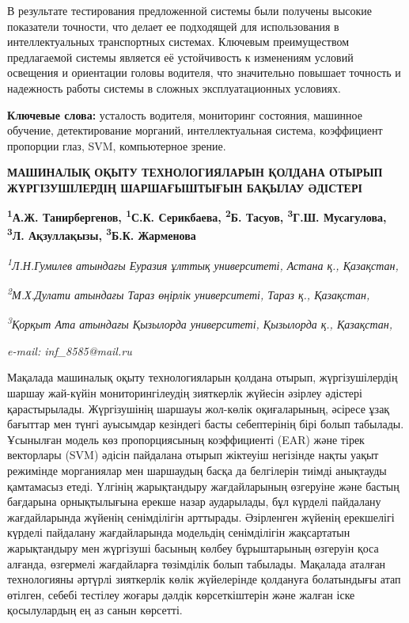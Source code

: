 В результате тестирования предложенной системы были получены высокие
показатели точности, что делает ее подходящей для использования в
интеллектуальных транспортных системах. Ключевым преимуществом
предлагаемой системы является её устойчивость к изменениям условий
освещения и ориентации головы водителя, что значительно повышает
точность и надежность работы системы в сложных эксплуатационных
условиях.

{\bfseries Ключевые слова:} усталость водителя, мониторинг состояния,
машинное обучение, детектирование морганий, интеллектуальная система,
коэффициент пропорции глаз, SVM, компьютерное зрение.

\begin{articleheader}
{\bfseries МАШИНАЛЫҚ ОҚЫТУ ТЕХНОЛОГИЯЛАРЫН ҚОЛДАНА ОТЫРЫП ЖҮРГІЗУШІЛЕРДІҢ
ШАРШАҒЫШТЫҒЫН БАҚЫЛАУ ӘДІСТЕРІ}

{\bfseries
\textsuperscript{1}А.Ж. Танирбергенов,
\textsuperscript{1}С.К. Серикбаева\textsuperscript{\envelope },
\textsuperscript{2}Б. Тасуов,
\textsuperscript{3}Г.Ш. Мусагулова,
\textsuperscript{3}Л. Ақзуллақызы,
\textsuperscript{3}Б.К. Жарменова}
\end{articleheader}

\begin{affiliation}
\emph{\textsuperscript{1}Л.Н.Гумилев атындағы Еуразия ұлттық университеті, Астана қ., Қазақстан,}

\emph{\textsuperscript{2}М.Х.Дулати атындағы Тараз өңірлік университеті, Тараз қ., Қазақстан,}

\emph{\textsuperscript{3}Қорқыт Ата атындағы Қызылорда университеті, Қызылорда қ., Қазақстан,}

\emph{e-mail: inf\_8585@mail.ru}
\end{affiliation}

Мақалада машиналық оқыту технологияларын қолдана отырып, жүргізушілердің
шаршау жай-күйін мониторингілеудің зияткерлік жүйесін әзірлеу әдістері
қарастырылады. Жүргізушінің шаршауы жол-көлік оқиғаларының, әсіресе ұзақ
бағыттар мен түнгі ауысымдар кезіндегі басты себептерінің бірі болып
табылады. Ұсынылған модель көз пропорциясының коэффициенті (EAR) және
тірек векторлары (SVM) әдісін пайдалана отырып жіктеуіш негізінде нақты
уақыт режимінде морганиялар мен шаршаудың басқа да белгілерін тиімді
анықтауды қамтамасыз етеді. Үлгінің жарықтандыру жағдайларының өзгеруіне
және бастың бағдарына орнықтылығына ерекше назар аударылады, бұл күрделі
пайдалану жағдайларында жүйенің сенімділігін арттырады. Әзірленген
жүйенің ерекшелігі күрделі пайдалану жағдайларында модельдің
сенімділігін жақсартатын жарықтандыру мен жүргізуші басының көлбеу
бұрыштарының өзгеруін қоса алғанда, өзгермелі жағдайларға төзімділік
болып табылады. Мақалада аталған технологияны әртүрлі зияткерлік көлік
жүйелерінде қолдануға болатындығы атап өтілген, себебі тестілеу жоғары
дәлдік көрсеткіштерін және жалған іске қосылулардың ең аз санын
көрсетті.

